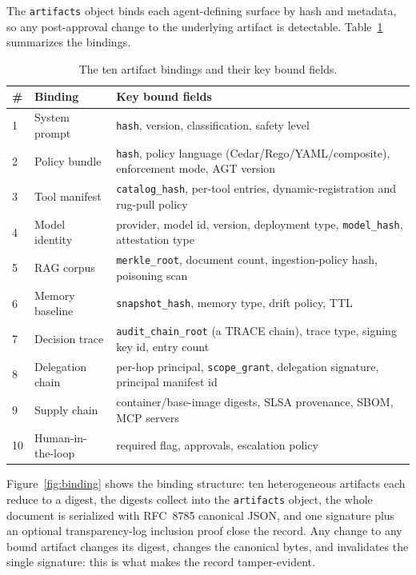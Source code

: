 The \texttt{artifacts} object binds each agent-defining surface by hash and metadata,
so any post-approval change to the underlying artifact is detectable.
Table~\ref{tab:artifacts} summarizes the bindings.

\begin{table}[h]
\centering
\small
\caption{The ten artifact bindings and their key bound fields.}
\label{tab:artifacts}
\begin{tabular}{p{0.4cm}p{3.0cm}p{8.6cm}}
\toprule
\# & Binding & Key bound fields \\
\midrule
1 & System prompt & \texttt{hash}, version, classification, safety level \\
2 & Policy bundle & \texttt{hash}, policy language (Cedar/Rego/YAML/composite), enforcement mode, AGT version \\
3 & Tool manifest & \texttt{catalog\_hash}, per-tool entries, dynamic-registration and rug-pull policy \\
4 & Model identity & provider, model id, version, deployment type, \texttt{model\_hash}, attestation type \\
5 & RAG corpus & \texttt{merkle\_root}, document count, ingestion-policy hash, poisoning scan \\
6 & Memory baseline & \texttt{snapshot\_hash}, memory type, drift policy, TTL \\
7 & Decision trace & \texttt{audit\_chain\_root} (a TRACE chain), trace type, signing key id, entry count \\
8 & Delegation chain & per-hop principal, \texttt{scope\_grant}, delegation signature, principal manifest id \\
9 & Supply chain & container/base-image digests, SLSA provenance, SBOM, MCP servers \\
10 & Human-in-the-loop & required flag, approvals, escalation policy \\
\bottomrule
\end{tabular}
\end{table}

Figure~\ref{fig:binding} shows the binding structure: ten heterogeneous artifacts
each reduce to a digest, the digests collect into the \texttt{artifacts} object,
the whole document is serialized with RFC~8785 canonical JSON, and one signature
plus an optional transparency-log inclusion proof close the record. Any change to
any bound artifact changes its digest, changes the canonical bytes, and invalidates
the single signature: this is what makes the record tamper-evident.

